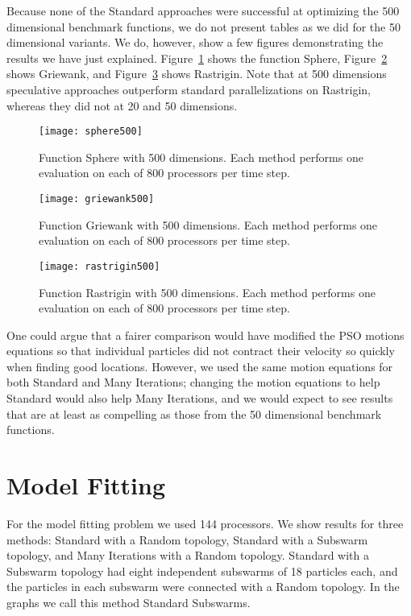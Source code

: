 \documentclass[ms,electronic,twosidetoc,letterpaper,chaptercenter,parttop,equalmargins]{byumsphd}
\newcommand{\fig}[1]{Figure~\ref{fig:#1}}
\begin{document}
Because none of the Standard approaches were successful at optimizing the 500
dimensional benchmark functions, we do not present tables as we did for the 50
dimensional variants.  We do, however, show a few figures demonstrating the
results we have just explained.  \fig{sphere500} shows the function Sphere,
\fig{griewank500} shows Griewank, and \fig{rastrigin500} shows Rastrigin.  Note
that at 500 dimensions speculative approaches outperform standard
parallelizations on Rastrigin, whereas they did not at 20 and 50 dimensions.

\begin{figure}
  \centering
  \texttt{[image: sphere500]}
  \caption{Function Sphere with 500 dimensions.  Each method performs one
  evaluation on each of 800 processors per time step.}
  \label{fig:sphere500}
\end{figure}

\begin{figure}
  \centering
  \texttt{[image: griewank500]}
  \caption{Function Griewank with 500 dimensions.  Each method performs one
  evaluation on each of 800 processors per time step.}
  \label{fig:griewank500}
\end{figure}

\begin{figure}
  \centering
  \texttt{[image: rastrigin500]}
  \caption{Function Rastrigin with 500 dimensions.  Each method performs one
  evaluation on each of 800 processors per time step.}
  \label{fig:rastrigin500}
\end{figure}

One could argue that a fairer comparison would have modified the PSO motions
equations so that individual particles did not contract their velocity so
quickly when finding good locations.  However, we used the same motion
equations for both Standard and Many Iterations; changing the motion equations
to help Standard would also help Many Iterations, and we would expect to see
results that are at least as compelling as those from the 50 dimensional
benchmark functions.

\section{Model Fitting}
\label{sec:model}

For the model fitting problem we used 144 processors.  We show results for
three methods: Standard with a Random topology, Standard with a Subswarm
topology, and Many Iterations with a Random topology.  Standard with a Subswarm
topology had eight independent subswarms of 18 particles each, and the
particles in each subswarm were connected with a Random topology.  In the
graphs we call this method Standard Subswarms.
\end{document}
